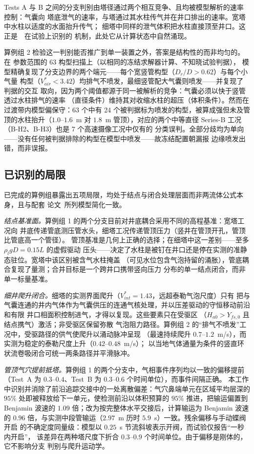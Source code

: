 \documentclass[preprint,12pt]{elsarticle}
\begin{document}
Tests A 与 B 之间的分支判别由塔径通过两个相互竞争、且均被模型解析的速率控制：气囊向
塔底泄气的速率，与塔通过其水柱传气并在井口排出的速率。宽塔中水柱以适度的水面抬升传气；
细塔中同样的泄气体积把水柱直接顶至井口。这正是~\cite{vasconcelos2011}~在试验上识别的
机制，此处它从计算状态中自然涌现。

算例组 2 检验这一判别能否推广到单一装置之外，答案是结构性的而非均匀的。在
\cite{cong2017} 参数范围的 63 构型扫描上（以相同的冻结求解器计算、不知晓试验判据），
模型精确复现了分支边界的两个端元——每个宽竖管构型（$D_r/D>0.62$）与每个小气量
构型（$V^{*}_{air}<3.42$）均排气不喷发，最细竖管配大气囊则喷发——并复现了判据的交互
取向，因为两个阈值都源于同一被解析的竞争：气囊必须以快于竖管透过水柱排气的速率
（直径条件）维持其对收缩水柱的超压（体积条件）。然而在过渡带内模型偏保守：63 个中有
24 个被判据标为喷发的构型，被算成强但未及管顶的水柱抬升（$1.0$--$1.6$~m 对 $1.8$~m
管顶），对应的两个中等直径 Series-B 工况（B-H2、B-H3）也是 7 个高速摄像工况中仅有的
分类误判。全部分歧均为单向——没有任何被判据排除的构型在模型中喷发——故冻结配置朝漏报
边缘喷发出错，而非误报。

\subsection{已识别的局限}

已完成的算例组暴露出五项局限，均处于结点与闭合处理层面而非两流体公式本身，且与配套
论文~\cite{xue2026model}所列模型简化一致。

\emph{结点基准面。}算例组 1 的两个分支目前对井底耦合采用不同的高程基准：宽塔工况向
井底传递管底测压管水头，细塔工况传递管顶压力（竖井在管顶开孔，管顶比管底高一个管径）。
管顶基准是几何上正确的选择；在细塔中这一差别——至多 $\rho_l g D=0.15L$ 的虚假驱动
压头——决定了水柱是被钉在井口还是停在实测的准静态驻位。宽塔中该区别被含气水柱掩盖
（可见水位包含气泡持留的涌胀），管底耦合复现了量测；合并目标是一个跨井口携带竖向压力
分布的单一结点闭合，而非单一标量基准。

\emph{细井爬升闭合。}细塔的实测界面爬升（$V^{*}_{int}=1.43$，远超泰勒气泡尺度）只有
把与气囊连通的井内气体作为气囊供压的连通气核处理，并以压差驱动的守恒移动前沿和有限
井口相面积控制进气，才得以复现。这些要素只在受驱区
（$H_{a0}>Y_{fs,0}$ 且结点携气）激活；非受驱区保留弥散
气泡阻力路径。算例组 2 的``排气不喷发''工况中，受驱路径的供气使爬升以涌动脉冲呈现
（最速持续爬升 $0.7$--$1.2$~m/s），而实测为稳定的泰勒尺度上升（$0.42$--$0.48$~m/s）；
以当地气体通量为条件的竖直环状流卷吸闭合可统一两条路径并平滑脉冲。

\emph{管顶气穴提前抵塔。}算例组 1 的两个分支中，气相事件序列均以一致的偏移提前
（Test~A 为 $0.3$--$0.4$、Test~B 为 $0.3$--$0.6$ 个时间单位），而事件间隔正确。
本工作中识别并消除了前沿追踪交接中的一处离散偏差：气穴鼻端单元在区域平均层深的
$95\%$ 处即被释放给下一单元，使检测前沿以体积预算的 $95\%$ 推进，把输运偏置到
Benjamin 波速的 $1.09$ 倍；改为按完整体水平交接后，计算输运为 Benjamin 波速的
$0.96$ 倍，与实测中段管输运（$2.97$~m 历时 $5.9$~s）一致。残余偏移与手动蝶阀开启
的不确定度同量级：模型以 $0.25$~s 节流斜坡表示开阀，而试验仅报告``一秒内开启''，
该差异在两种塔尺度下折合 $0.3$--$0.9$ 个时间单位。由于偏移是刚体的，它不影响分支
判别与爬升运动学。
\end{document}
